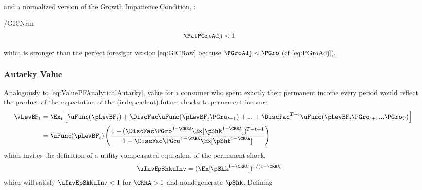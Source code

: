 \documentclass[BufferStockTheory]{subfiles}
\providecommand{\LtxDir}{LaTeX/}
\begin{document}
and a normalized version of the Growth Impatience Condition, {\GICNrm}:
\begin{verbatimwrite}{\EqDir/GICNrm}
  \begin{align}
    \PatPGroAdj  & < 1 \label{eq:GICNrm}
  \end{align}\end{verbatimwrite}

which is stronger than the perfect foresight version \eqref{eq:GICRaw} because $\PGroAdj < \PGro$ (cf \eqref{eq:PGroAdj}).
\begin{comment}
\begin{align}
  \PGroAdj & < \PGro \label{eq:PGroAdjLTPGro}.
\end{align}
\end{comment}

\hypertarget{Autarky-Value}{}
\subsubsection{Autarky Value}
Analogously to \eqref{eq:ValuePFAnalyticalAutarky}, value for a consumer who spent exactly their permanent income every period would reflect the product of the expectation of the (independent) future shocks to permanent income:\hypertarget{uInvEpShkuInv}{}
\begin{align*}
  \vLevBF_{t}  & = \Ex_{t}\left[\uFunc(\pLevBF_{t}) + \DiscFac \uFunc(\pLevBF_{t}\PGro_{t+1}) + ... + \DiscFac^{T-t}\uFunc(\pLevBF_{t}\PGro_{t+1}...\PGro_{T})\right] \\
               & = \uFunc(\pLevBF_{t})\left(\frac{1-(\DiscFac \PGro^{1-\CRRA}\Ex[\pShk^{1-\CRRA}])^{T-t+1}}{1-\DiscFac \PGro^{1-\CRRA} \Ex[\pShk^{1-\CRRA}]}\right)
\end{align*}
which invites the definition of a utility-compensated equivalent of the permanent shock,\hypertarget{PermGrouAdj}{}
\begin{align}
  \uInvEpShkuInv  & = (\Ex[\pShk^{1-\CRRA}])^{1/(1-\CRRA)} \label{eq:uInvEpShkuInv}
\end{align}
which will satisfy $\uInvEpShkuInv < 1$ for $\CRRA>1$ and nondegenerate $\pShk$.%
\hypertarget{DiscAltuAdj}{} Defining
\end{document}
